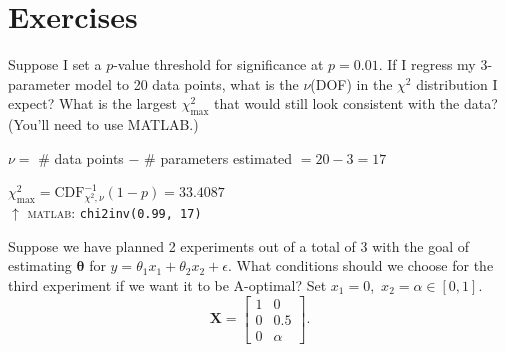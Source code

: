 \section{Exercises}

\begin{exercise} %
    Suppose I set a $p$-value threshold for significance at $p = 0.01$. If I regress my 3-parameter model to 20 data points, what is the $\nu$(DOF) in the $\chi^2$ distribution I expect? What is the largest $\chi^2_{\text{max}}$ that would still look consistent with the data? (You'll need to use MATLAB.)
\end{exercise}

\begin{solution}
    \(\nu =\) \# data points \(-\) \# parameters estimated \(= 20 - 3 = 17\)

    \(\chi^2_{\text{max}} = \text{CDF}^{-1}_{\chi^2,\nu}(1-p) = 33.4087\)\\
    \(\uparrow\) \textsc{matlab}: \texttt{chi2inv(0.99, 17)}
\end{solution}

\begin{exercise} %
    Suppose we have planned 2 experiments out of a total of 3 with the goal of estimating $\boldsymbol{\theta}$ for $y = \theta_1 x_1 + \theta_2 x_2 + \epsilon$. What conditions should we choose for the third experiment if we want it to be A-optimal? Set $x_1 = 0$,\ $x_2 = \alpha \in [0,1]$.
    \[
        \mathbf{X} = \begin{bmatrix} 1 & 0 \\ 0 & 0.5 \\ 0 & \alpha \end{bmatrix}.
    \]
\end{exercise}

